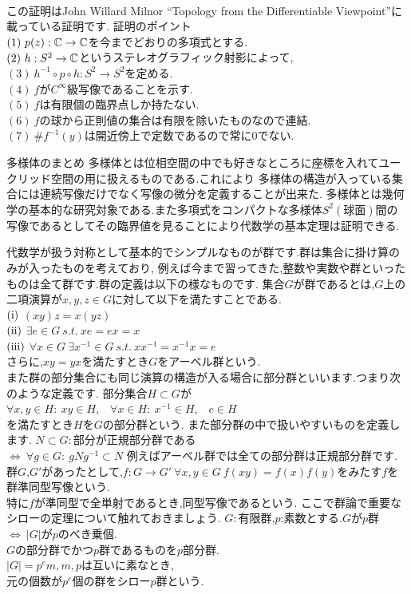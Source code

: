 \proof[多様体論を用いた代数学の基本定理の証明]
\leavevmode\\
この証明はJohn Willard Milnor ``Topology from the Differentiable Viewpoint''に載っている証明です.
証明のポイント\\
$(1)\ p(z):\C\to\C$を今までどおりの多項式とする.\\
$(2)\ h:S^2\to\C$というステレオグラフィック射影によって,\\
$(3)\ h^{-1}\circ p \circ h : S^2 \to S^2$を定める.\\
$(4)\ f$が$C^\infty$級写像であることを示す.\\
$(5)\ f$は有限個の臨界点しか持たない.\\
$(6)\ f$の球から正則値の集合は有限を除いたものなので連結.\\
$(7)\ \# f^{-1}(y)$は開近傍上で定数であるので常に0でない.\\
\proofx
\begin{itembox}[l]{多様体のまとめ}
多様体とは位相空間の中でも好きなところに座標を入れてユークリッド空間の用に扱えるものである.これにより
多様体の構造が入っている集合には連続写像だけでなく写像の微分を定義することが出来た.
多様体とは幾何学の基本的な研究対象である.また多項式をコンパクトな多様体$S^2(球面)$間の写像であるとしてその臨界値を見ることにより代数学の基本定理は証明できる.

\end{itembox}
代数学が扱う対称として基本的でシンプルなものが群です.群は集合に掛け算のみが入ったものを考えており,
例えば今まで習ってきた,整数や実数や群といったものは全て群です.群の定義は以下の様なものです.
集合$G$が群であるとは,$G$上の二項演算が$x,y,z\in G$に対して以下を満たすことである.\\
$\rm (i)$ $(xy)z=x(yz)$\\
$\rm (ii)$ $\exists e \in  G \ s.t. \ xe=ex=x$\\
$\rm (iii)$ $\forall x\in G \ \exists x^{-1} \in G \ s.t. \ x x^{-1} = x^{-1} x= e$\\
さらに,$xy=yx$を満たすとき$G$をアーベル群という.\\
また群の部分集合にも同じ演算の構造が入る場合に部分群といいます.つまり次のような定義です.
部分集合$H\subset G$が\\
$\forall x,y \in H: \ xy\in H$,\ \ $\forall x\in H:\ x^{-1} \in H$,\ \ $e\in H$\\
を満たすとき$H$を$G$の部分群という.
また部分群の中で扱いやすいものを定義します.
$N\subset G:$部分が正規部分群である\\
$\iff \ \forall g\in G : \ gNg^{-1} \subset N$
例えばアーベル群では全ての部分群は正規部分群です.
群$G$,$G'$があったとして,$f:G\to G' \  \forall x,y \in G \ f(xy)=f(x)f(y)$をみたす$f$を群準同型写像という.\\
特に$f$が準同型で全単射であるとき,同型写像であるという.
ここで群論で重要なシローの定理について触れておきましょう.
$G:$有限群,$p$:素数とする.$G$が$p$群$\iff\ |G|$が$p$のべき乗個.\\
$G$の部分群でかつ$p$群であるものを$p$部分群.\\
$|G|=p^e m, m,p$は互いに素なとき,\\
元の個数が$p^e$個の群をシロー$p$群という.

